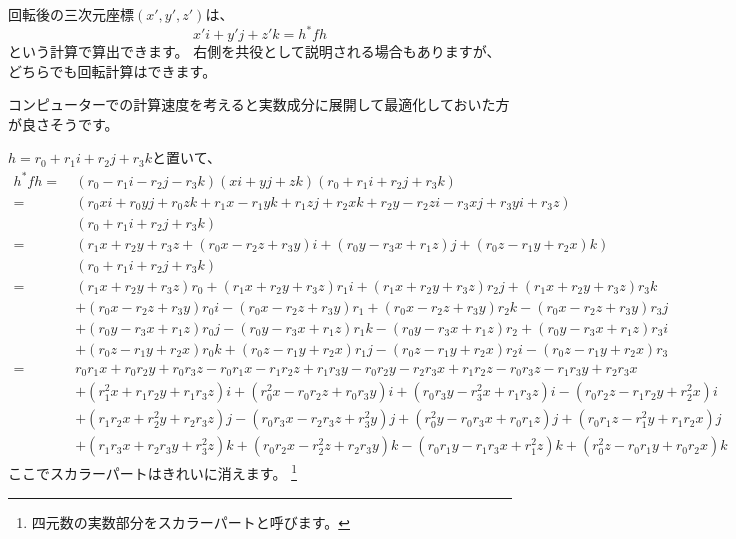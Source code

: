 \documentclass[a4paper,12pt,notitlepage]{jsreport}
\begin{document}
回転後の三次元座標$(x',y',z')$は、
\begin{equation}
  x'i+y'j+z'k=h^*fh
\end{equation}
という計算で算出できます。
右側を共役として説明される場合もありますが、どちらでも回転計算はできます。

コンピューターでの計算速度を考えると実数成分に展開して最適化しておいた方が良さそうです。

$h=r_0+r_1i+r_2j+r_3k$と置いて、
\begin{equation}
  \begin{split}
    h^*fh=~&(r_0-r_1i-r_2j-r_3k)(xi+yj+zk)(r_0+r_1i+r_2j+r_3k)\\
    =~&(r_0xi+r_0yj+r_0zk+r_1x-r_1yk+r_1zj+r_2xk+r_2y-r_2zi-r_3xj+r_3yi+r_3z)\\
    &(r_0+r_1i+r_2j+r_3k)\\
    =~&(r_1x+r_2y+r_3z+(r_0x-r_2z+r_3y)i+(r_0y-r_3x+r_1z)j+(r_0z-r_1y+r_2x)k)\\
    &(r_0+r_1i+r_2j+r_3k)\\
    =~&(r_1x+r_2y+r_3z)r_0+(r_1x+r_2y+r_3z)r_1i+(r_1x+r_2y+r_3z)r_2j+(r_1x+r_2y+r_3z)r_3k\\
    &+(r_0x-r_2z+r_3y)r_0i-(r_0x-r_2z+r_3y)r_1+(r_0x-r_2z+r_3y)r_2k-(r_0x-r_2z+r_3y)r_3j\\
    &+(r_0y-r_3x+r_1z)r_0j-(r_0y-r_3x+r_1z)r_1k-(r_0y-r_3x+r_1z)r_2+(r_0y-r_3x+r_1z)r_3i\\
    &+(r_0z-r_1y+r_2x)r_0k+(r_0z-r_1y+r_2x)r_1j-(r_0z-r_1y+r_2x)r_2i-(r_0z-r_1y+r_2x)r_3\\
    =~&r_0r_1x+r_0r_2y+r_0r_3z-r_0r_1x-r_1r_2z+r_1r_3y-r_0r_2y-r_2r_3x+r_1r_2z-r_0r_3z-r_1r_3y+r_2r_3x\\
    &+(r_1^2x+r_1r_2y+r_1r_3z)i+(r_0^2x-r_0r_2z+r_0r_3y)i+(r_0r_3y-r_3^2x+r_1r_3z)i-(r_0r_2z-r_1r_2y+r_2^2x)i\\
    &+(r_1r_2x+r_2^2y+r_2r_3z)j-(r_0r_3x-r_2r_3z+r_3^2y)j+(r_0^2y-r_0r_3x+r_0r_1z)j+(r_0r_1z-r_1^2y+r_1r_2x)j\\
    &+(r_1r_3x+r_2r_3y+r_3^2z)k+(r_0r_2x-r_2^2z+r_2r_3y)k-(r_0r_1y-r_1r_3x+r_1^2z)k+(r_0^2z-r_0r_1y+r_0r_2x)k
  \end{split}
\end{equation}
ここでスカラーパートはきれいに消えます。
\footnote{四元数の実数部分をスカラーパートと呼びます。}
\end{document}
